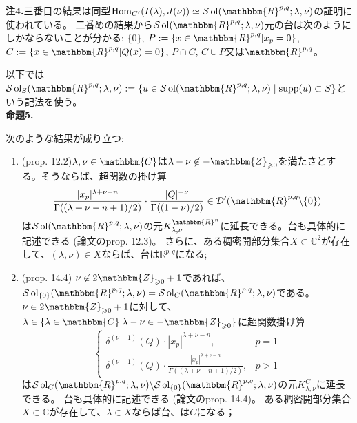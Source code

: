 \documentclass[a4paper,10pt]{article} %
\newcommand{\assign}{:=}
\newcommand{\nin}{\not\in}
\newcommand{\tmop}[1]{\ensuremath{\operatorname{#1}}}
\newcommand{\tmtextbf}[1]{{\bfseries{#1}}}
\newcommand{\tmtextit}[1]{{\itshape{#1}}}
\begin{document}
{\noindent}\tmtextbf{注\textbf{4}.}三番目の結果は同型$\tmop{Hom}_{G'} ( I ( \lambda), J ( \nu)) \simeq
\mathcal{S} \tmop{ol} ( \mathbbm{R}^{p, q} ; \lambda, \nu)$の証明に使われている。
二番めの結果から$\mathcal{S} \tmop{ol} (
\mathbbm{R}^{p, q} ; \lambda, \nu)$元の台は次のようにしかならないことが分かる: $\{ 0
\}$, $P \assign \{ x \in \mathbbm{R}^{p, q} | x_p = 0 \}$, $C \assign \{ x \in
\mathbbm{R}^{p, q} | Q ( x) = 0 \}$, $P \cap C$, $C \cup P$又は$\mathbbm{R}^{p, q}$。

以下では$\mathcal{S} \tmop{ol}_S ( \mathbbm{R}^{p,
q} ; \lambda, \nu):=\{u\in\mathcal{S} \tmop{ol} ( \mathbbm{R}^{p,
q} ; \lambda, \nu)\mid \supp(u)\subset S\}$という記法を使う。\\

{\noindent}\tmtextbf{命題\textbf{5}.}\tmtextit{次のような結果が成り立つ:
\begin{enumerate}
 \item (prop. 12.2)$\lambda, \nu \in \mathbbm{C}$は$\lambda - \nu \nin -\mathbbm{Z}_{\geqslant 0}$を満たさとする。そうならば、超関数の掛け算
 \[ \frac{| x_p |^{\lambda + \nu - n}}{\Gamma ( ( \lambda + \nu - n + 1) /
 2)} \cdot \frac{| Q |^{- \nu}}{\Gamma ( ( 1 - \nu) / 2)} \in \mathcal{D}'
 ( \mathbbm{R}^{p, q} \backslash \{ 0 \}) \]
 は$\mathcal{S} \tmop{ol} (
 \mathbbm{R}^{p, q} ; \lambda, \nu)$の元$K_{\lambda, \nu}^{\mathbbm{R}^n}$に延長できる。台も具体的に記述できる
 (論文のprop. 12.3)。
 さらに、ある稠密開部分集合$X\subset\mathbb{C}^2$が存在して、$(\lambda,\nu)\in X$ならば、台は$\mathbb{R}^{p,q}$になる;
 
 \item (prop. 14.4) $\nu \nin
 2\mathbbm{Z}_{\geqslant 0} + 1$であれば、$\mathcal{S} \tmop{ol}_{\{ 0 \}} (
 \mathbbm{R}^{p, q} ; \lambda, \nu) =\mathcal{S} \tmop{ol}_C (
 \mathbbm{R}^{p, q} ; \lambda, \nu)$である。$\nu \in
 2\mathbbm{Z}_{\geqslant 0} + 1$に対して、$\lambda \in \{ \lambda \in
 \mathbbm{C} | \lambda - \nu \in -\mathbbm{Z}_{\geqslant 0} \}$に超関数掛け算
 \[ \left\{ \begin{array}{ll}
 \delta^{( \nu - 1)} ( Q) \cdot | x_p |^{\lambda + \nu - n}, & p = 1\\
 \delta^{( \nu - 1)} ( Q) \cdot \frac{| x_p |^{\lambda + \nu -
 n}}{\Gamma ( ( \lambda + \nu - n + 1) / 2)}, & p > 1
 \end{array} \right. \]
 は$\mathcal{S} \tmop{ol}_C (
 \mathbbm{R}^{p, q} ; \lambda, \nu) \backslash\mathcal{S} \tmop{ol}_{\{ 0 \}}
 ( \mathbbm{R}^{p, q} ; \lambda, \nu)$の元$K_{\lambda, \nu}^C$に延長できる。
台も具体的に記述できる
 (論文のprop. 14.4)。
 ある稠密開部分集合$X\subset\mathbb{C}$が存在して、$\lambda\in X$ならば台、は$C$になる；
 

\end{enumerate}}
\end{document}
